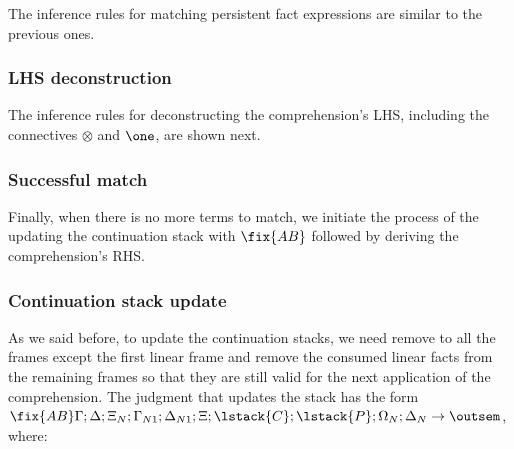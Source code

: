 The inference rules for matching persistent fact expressions are similar to the
previous ones.



\subsubsection{LHS deconstruction}

The inference rules for deconstructing the comprehension's LHS, including the
connectives $\otimes$ and $\one$, are shown next.



\subsubsection{Successful match}

Finally, when there is no more terms to match, we initiate the process of the
updating the continuation stack with $\fix{AB}$ followed by deriving the
comprehension's RHS.



\subsubsection{Continuation stack update}

As we said before, to update the continuation stacks, we need remove to all the
frames except the first linear frame and remove the consumed linear facts from
the remaining frames so that they are still valid for the next application of
the comprehension.  The judgment that updates the stack has the form $\fix{AB}
\Gamma; \Delta; \Xi_N; \Gamma_{N1}; \Delta_{N1}; \Xi; \lstack{C}; \lstack{P}; \Omega_N; \Delta_N
\rightarrow \outsem$, where:

